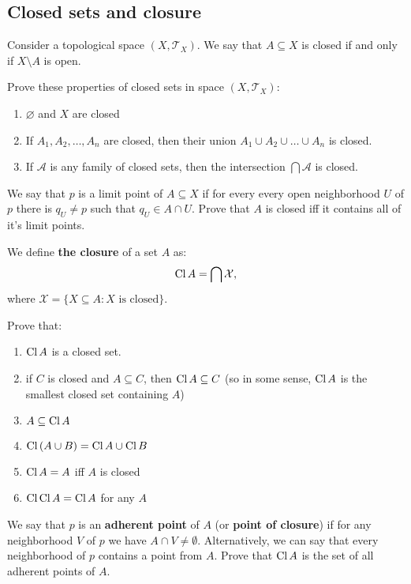 \subsection{Closed sets and closure}
Consider a topological space $(X, \mathcal T_X)$. We say that $A\subseteq X$ is closed if and only if $X\setminus A$ is open.

\begin{prob}
  Prove these properties of closed sets in space $(X, \mathcal T_X)$:
  \begin{enumerate}
    \item $\varnothing$ and  $X$ are closed
    \item If $A_1, A_2,\dots, A_n$ are closed, then their
      union $A_1\cup A_2\cup\dots\cup A_n$ is closed.
    \item If $\mathcal A$ is any family of
      closed sets, then the intersection $\bigcap \mathcal A$ is
      closed.
  \end{enumerate}
\end{prob}

\begin{prob}
  We say that $p$ is a limit point of $A\subseteq X$ if for every every open neighborhood $U$ of $p$ there is $q_U\neq p$ such that
  $q_U\in A\cap U$. Prove that $A$ is closed iff it contains all
  of it's limit points.
\end{prob}

\noindent We define \textbf{the closure} of a set $A$ as:
$$\text{Cl\,} A = \bigcap \mathcal X,$$
where $\mathcal X = \{X\subseteq A : X \text{ is closed} \}$.

\begin{prob}
  Prove that:
  \begin{enumerate}
    \item $\text{Cl\,} A$ is a closed set.
    \item if $C$ is closed and $A\subseteq C$,
    then $\text{Cl\,} A\subseteq C$ (so in some sense,
    $\text{Cl\,} A$ is the smallest closed set containing $A$)
    \item $A\subseteq \text{Cl\,} A$
    \item $\text{Cl\,} (A\cup B) = \text{Cl\,} A \cup \text{Cl\,} B$
    \item $\text{Cl\,} A = A$ iff $A$ is closed
    \item $\text{Cl\,} \text{Cl\,} A = \text{Cl\,} A$ for any $A$
  \end{enumerate}
\end{prob}

\begin{prob}
	We say that $p$ is an \textbf{adherent point} of $A$
  (or \textbf{point of closure})
  if for any neighborhood $V$ of $p$ we have
  $A\cap V\neq \emptyset$. Alternatively, we can say that every
  neighborhood of $p$ contains
  a point from $A$. Prove that $\text{Cl\,} A$ is the set
	of all adherent points of $A$.
\end{prob}

